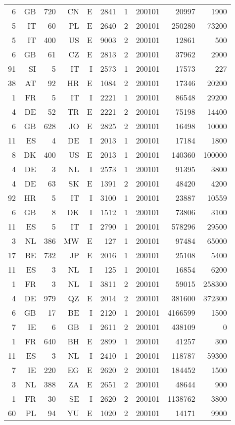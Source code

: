 {\begin{tabular}{rrrrrrrrrr}
  6 & GB & 720 & CN & E & 2841 & 1 & 200101 & 20997 & 1900 \\
  5 & IT & 60 & PL & E & 2640 & 2 & 200101 & 250280 & 73200 \\
  5 & IT & 400 & US & E & 9003 & 2 & 200101 & 12861 & 500 \\
  6 & GB & 61 & CZ & E & 2813 & 2 & 200101 & 37962 & 2900 \\
  91 & SI & 5 & IT & I & 2573 & 1 & 200101 & 17573 & 227 \\
  38 & AT & 92 & HR & E & 1084 & 2 & 200101 & 17346 & 20200 \\
  1 & FR & 5 & IT & I & 2221 & 1 & 200101 & 86548 & 29200 \\
  4 & DE & 52 & TR & E & 2221 & 2 & 200101 & 75198 & 14400 \\
  6 & GB & 628 & JO & E & 2825 & 2 & 200101 & 16498 & 10000 \\
  11 & ES & 4 & DE & I & 2013 & 1 & 200101 & 17184 & 1800 \\
  8 & DK & 400 & US & E & 2013 & 1 & 200101 & 140360 & 100000 \\
  4 & DE & 3 & NL & I & 2573 & 1 & 200101 & 91395 & 3800 \\
  4 & DE & 63 & SK & E & 1391 & 2 & 200101 & 48420 & 4200 \\
  92 & HR & 5 & IT & I & 3100 & 1 & 200101 & 23887 & 10559 \\
  6 & GB & 8 & DK & I & 1512 & 1 & 200101 & 73806 & 3100 \\
  11 & ES & 5 & IT & I & 2790 & 1 & 200101 & 578296 & 29500 \\
  3 & NL & 386 & MW & E & 127 & 1 & 200101 & 97484 & 65000 \\
  17 & BE & 732 & JP & E & 2016 & 1 & 200101 & 25108 & 5400 \\
  11 & ES & 3 & NL & I & 125 & 1 & 200101 & 16854 & 6200 \\
  1 & FR & 3 & NL & I & 3811 & 2 & 200101 & 59015 & 258300 \\
  4 & DE & 979 & QZ & E & 2014 & 2 & 200101 & 381600 & 372300 \\
  6 & GB & 17 & BE & I & 2120 & 1 & 200101 & 4166599 & 1500 \\
  7 & IE & 6 & GB & I & 2611 & 2 & 200101 & 438109 & 0 \\
  1 & FR & 640 & BH & E & 2899 & 1 & 200101 & 41257 & 300 \\
  11 & ES & 3 & NL & I & 2410 & 1 & 200101 & 118787 & 59300 \\
  7 & IE & 220 & EG & E & 2620 & 2 & 200101 & 184452 & 1500 \\
  3 & NL & 388 & ZA & E & 2651 & 2 & 200101 & 48644 & 900 \\
  1 & FR & 30 & SE & I & 2620 & 2 & 200101 & 1138762 & 3800 \\
  60 & PL & 94 & YU & E & 1020 & 2 & 200101 & 14171 & 9900 \\
 \bottomrule
\end{tabular}
}
